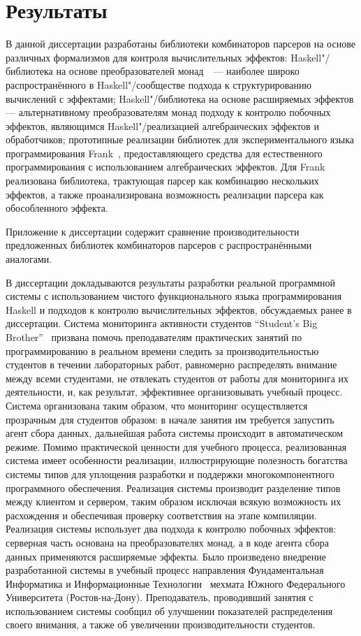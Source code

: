 \documentclass [fontsize=14pt, paper=a4, pagesize, DIV=calc]%
{article}
\begin{document}
\section{Результаты}

В данной диссертации разработаны библиотеки комбинаторов парсеров на основе
различных формализмов для контроля вычислительных эффектов: Haskell"/библиотека на
основе преобразователей монад~\cite{mdParse}~--- наиболее широко распространённого
в Haskell"/сообществе подхода к структурированию вычислений с эффектами; Haskell"/библиотека
на основе расширяемых эффектов --- альтернативному преобразователям монад подходу к контролю
побочных эффектов, являющимся Haskell"/реализацией алгебраических эффектов и обработчиков;
прототипные реализации библиотек для экспериментального языка программирования
Frank~\cite{frankoparsec}, предоставляющего средства для естественного программирования
с использованием алгебраических эффектов. Для Frank реализована библиотека, трактующая
парсер как комбинацию нескольких эффектов, а также проанализирована возможность
реализации парсера как обособленного эффекта.

Приложение к диссертации содержит сравнение производительности
предложенных библиотек комбинаторов парсеров с распространёнными аналогами.

В диссертации докладываются результаты разработки реальной программной
системы с использованием чистого функционального языка программирования Haskell и
подходов к контролю вычислительных эффектов, обсуждаемых ранее в диссертации.
Система мониторинга активности студентов ``Student's Big Brother''~\cite{sbbRepo}
призвана помочь преподавателям практических занятий по программированию
в реальном времени следить за производительностью студентов в течении лабораторных
работ, равномерно распределять
внимание между всеми студентами, не отвлекать студентов от работы для мониторинга
их деятельности, и, как результат, эффективнее организовывать учебный процесс.
Система организована таким образом, что мониторинг осуществляется прозрачным для
студентов образом: в начале занятия им требуется запустить агент сбора данных, дальнейшая
работа системы происходит в автоматическом режиме. Помимо практической ценности для
учебного процесса, реализованная система имеет особенности реализации, иллюстрирующие
полезность богатства системы типов для уплощения разработки и поддержки многокомпонентного
программного обеспечения. Реализация системы производит разделение типов между клиентом
и сервером, таким образом исключая всякую возможность их расхождения и обеспечивая проверку
соответствия на этапе компиляции. Реализация системы использует два подхода к контролю побочных эффектов: серверная часть основана на преобразователях монад, а в коде агента сбора
данных применяются расширяемые эффекты. Было произведено внедрение разработанной системы
в учебный процесс направления Фундаментальная Информатика и Информационные
Технологии~\cite{fiit} мехмата Южного Федерального Университета (Ростов-на-Дону).
Преподаватель, проводивший занятия с использованием системы сообщил об
улучшении показателей распределения своего внимания, а также об увеличении
производительности студентов.
\end{document}
